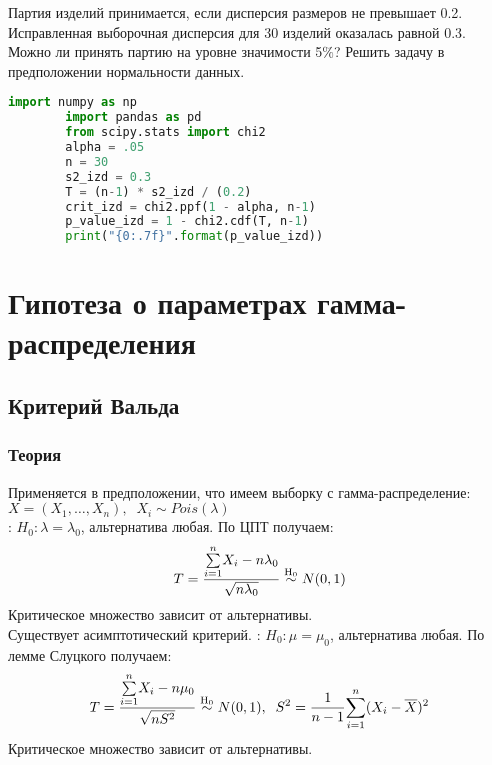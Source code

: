 \begin{problem}
	 Партия изделий принимается, если дисперсия размеров не превышает 0.2. Исправленная выборочная дисперсия для 30 изделий оказалась равной 0.3. Можно ли принять партию на уровне значимости 5$\%$? Решить задачу в предположении нормальности данных.
\end{problem}
\begin{solution}
	\begin{lstlisting}[language=Python]
		import numpy as np
		import pandas as pd
		from scipy.stats import chi2
		alpha = .05
		n = 30
		s2_izd = 0.3
		T = (n-1) * s2_izd / (0.2)
		crit_izd = chi2.ppf(1 - alpha, n-1)
		p_value_izd = 1 - chi2.cdf(T, n-1)
		print("{0:.7f}".format(p_value_izd))
	\end{lstlisting}
\end{solution}

\section{Гипотеза о параметрах гамма-распределения}\label{cha:1sample/sec:gamma}

\subsection{Критерий Вальда}\label{cha:1sample/sec:gamma/subsec:vald}

\subsubsection*{Теория}\label{cha:1sample/sec:gamma/subsec:vald/subsubsec:theory}

Применяется в предположении, что имеем выборку с гамма-распределение: \\ $X = (X_1, \dots, X_n), \;\; X_i \sim Pois (\lambda)$\\
: $H_0: \lambda = \lambda_0$, альтернатива любая. По ЦПТ получаем:
$$T = \frac{\underset{i=1}{\overset{n}{\sum}}X_i - n \lambda_0}{\sqrt{n \lambda_0}} \mathrel{\stackrel{\rm H_0}\sim} N(0,1)$$
Критическое множество зависит от альтернативы.\\

Существует асимптотический критерий. : $H_0: \mu = \mu_0$, альтернатива любая. По лемме Слуцкого получаем:
$$T = \frac{\underset{i=1}{\overset{n}{\sum}}X_i - n \mu_0}{\sqrt{n S^2}} \mathrel{\stackrel{\rm H_0}\sim} N(0,1), \;\; S^2 = \frac{1}{n-1} \underset{i=1}{\overset{n}{\sum}}(X_i - \overline{X})^2$$
Критическое множество зависит от альтернативы.\\

